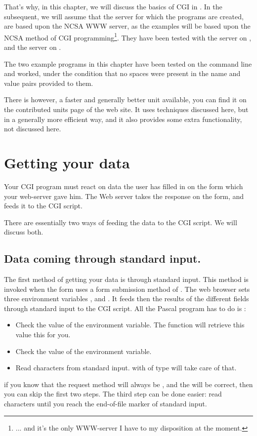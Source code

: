 \documentclass{report}
\begin{document}
That's why, in this chapter, we will discuss the basics of CGI in \fpc.
In the subsequent, we will assume that the server for which the programs are 
created, are based upon the NCSA  WWW server, as the examples
will be based upon the NCSA method of CGI programming\footnote{... and it's 
the only WWW-server I have to my disposition at the moment.}.
They have been tested with the  server on \linux, and 
the  server on \windowsnt.

The two example programs in this chapter have been tested on the command line 
and worked, under the condition that no spaces were present in the name and 
value pairs provided to them.

There is however, a faster and generally better  unit available,
you can find it on the contributed units page of the \fpc web site. It uses
techniques discussed here, but in a generally more efficient way, and it
also provides some extra functionality, not discussed here.

\section{Getting your data}
Your CGI program must react on data the user has filled in on the form which
your web-server gave him. The Web server takes the response on the form, and
feeds it to the CGI script.

There are essentially two ways of feeding the data to the CGI script. We will
discuss both.

%
%

\subsection{Data coming through standard input.}
The first method of getting your data is through standard input. This method
is invoked when the form uses a form submission method of .
The web browser sets three environment variables ,
 and . It feeds then the results of
the different fields through standard input to the CGI script.
All the Pascal program has to do is :
\begin{itemize}
\item Check the value of the  environment variable. The
 function will retrieve this value this for you.
\item Check the value of the  environment variable.
\item Read  characters from standard input.  with  of type  will take care of that.
\end{itemize}
if you know that the request method will always be , and the
 will be correct, then you can skip the first two steps.
The third step can be done easier: read characters until you reach the
end-of-file marker of standard input.
\end{document}
